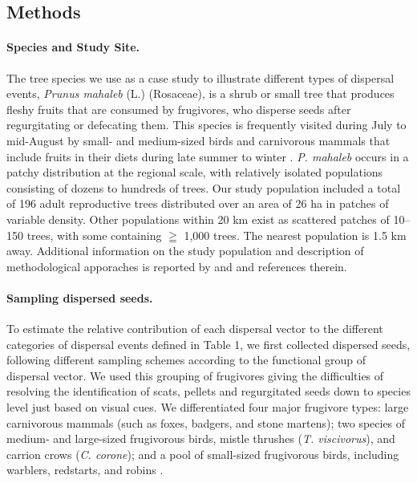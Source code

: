 \documentclass[a4paper, 12pt]{article}
\begin{document}
\begin{linenumbers}

\section*{Methods}

\paragraph*{Species and Study Site.} The tree species we use as a case study to illustrate different types of dispersal events, \textit{Prunus mahaleb} (L.) (Rosaceae), is a shrub or small tree that produces fleshy fruits that are consumed by frugivores, who disperse seeds after regurgitating or defecating them. This species is frequently visited during July to mid-August by small- and medium-sized birds and carnivorous mammals that include fruits in their diets during late summer to winter \citep{Jordano:2000ft}. \textit{P. mahaleb} occurs in a patchy distribution at the regional scale, with relatively isolated populations consisting of dozens to hundreds of trees. Our study population included a total of 196 adult reproductive trees distributed over an area of 26 ha in patches of variable density. Other populations within 20 km exist as scattered patches of 10–150 trees, with some containing $\geqq$ 1,000 trees. The nearest population is 1.5 km away. Additional information on the study population and description of methodological apporaches is reported by \citet{Jordano:2007} and \citet{Garcia:2009do} and references therein.

\paragraph*{Sampling dispersed seeds.} 
To estimate the relative contribution of each dispersal vector to the different categories of dispersal events defined in Table 1, we first collected dispersed seeds, following different sampling schemes according to the functional group of dispersal vector. We used this grouping of frugivores giving the difficulties of resolving the identification of scats, pellets and regurgitated seeds down to species level just based on visual cues. We differentiated four major frugivore types: large carnivorous mammals (such as foxes, badgers, and stone martens); two species of medium- and large-sized frugivorous birds, mistle thrushes (\textit{T. viscivorus}), and carrion crows (\textit{C. corone}); and a pool of small-sized frugivorous birds, including warblers, redstarts, and robins \citep{Jordano:2007}. 


\end{linenumbers}
\end{document}
